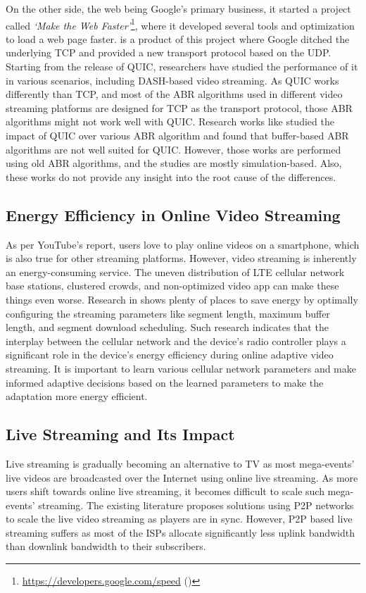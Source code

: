 On the other side, the web being Google's primary business, it started a project called \textit{`Make the Web Faster'}\footnote{\url{https://developers.google.com/speed} (\lastaccessedtoday)}, where it developed several tools and optimization to load a web page faster. \cite{langley2017quic} is a product of this project where Google ditched the underlying \ac{TCP} and provided a new transport protocol based on the \ac{UDP}. Starting from the release of \ac{QUIC}, researchers have studied the performance of it in various scenarios, including \ac{DASH}-based video streaming. As \ac{QUIC} works differently than \ac{TCP}, and most of the \ac{ABR} algorithms used in different video streaming platforms are designed for \ac{TCP} as the transport protocol, those \ac{ABR} algorithms might not work well with \ac{QUIC}. Research works like \cite{bhat2018improving,van2018empirical} studied the impact of \ac{QUIC} over various \ac{ABR} algorithm and found that buffer-based \ac{ABR} algorithms are not well suited for \ac{QUIC}. However, those works are performed using old \ac{ABR} algorithms, and the studies are mostly simulation-based. Also, these works do not provide any insight into the root cause of the differences.

\subsection{Energy Efficiency in Online Video Streaming}
As per YouTube's report, users love to play online videos on a smartphone, which is also true for other streaming platforms. However, video streaming is inherently an energy-consuming service. The uneven distribution of \ac{LTE} cellular network base stations, clustered crowds, and non-optimized video app can make these things even worse. Research in \cite{10.1145/2910018.2910656} shows plenty of places to save energy by optimally configuring the streaming parameters like segment length, maximum buffer length, and segment download scheduling. Such research indicates that the interplay between the cellular network and the device's radio controller plays a significant role in the device's energy efficiency during online adaptive video streaming. It is important to learn various cellular network parameters and make informed adaptive decisions based on the learned parameters to make the adaptation more energy efficient.

\subsection{Live Streaming and Its Impact}
Live streaming is gradually becoming an alternative to \ac{TV} as most mega-events' live videos are broadcasted over the Internet using online live streaming. As more users shift towards online live streaming, it becomes difficult to scale such mega-events' streaming. The existing literature proposes solutions using \ac{P2P} networks to scale the live video streaming as players are in sync. However, \ac{P2P} based live streaming suffers as most of the \acp{ISP} allocate significantly less uplink bandwidth than downlink bandwidth to their subscribers. 

